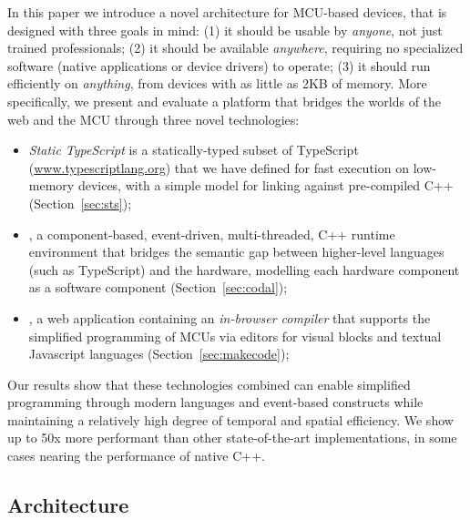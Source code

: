 In this paper we introduce a novel architecture for MCU-based devices,
that is designed with three goals in mind: 
(1) it should be usable by \emph{anyone}, not just trained professionals; 
(2) it should be available \emph{anywhere}, requiring no specialized software (native applications
or device drivers) to operate;
(3) it should run efficiently on \emph{anything}, from devices with as little as 2KB of memory.
More specifically, we present and evaluate a platform that bridges the worlds of the web and the 
MCU through three novel technologies:

\begin{itemize}
\item \emph{Static TypeScript} is a statically-typed subset of TypeScript
(\url{www.typescriptlang.org}) that we have defined for fast execution on low-memory devices,
with a simple model for linking against pre-compiled C++ (Section~\ref{sec:sts});

\item \emph{\CO}, a component-based, event-driven, multi-threaded, C++ runtime environment
that bridges the semantic gap between higher-level languages (such as TypeScript) and the hardware,
modelling each hardware component as a software component (Section~\ref{sec:codal});

\item \emph{\MCN}, a web application containing an \emph{in-browser compiler} that supports the 
simplified programming of MCUs via editors for visual blocks and textual Javascript languages 
(Section~\ref{sec:makecode});
\end{itemize}

Our results show that these technologies combined can enable simplified programming through modern
languages and event-based constructs while maintaining a relatively high degree of temporal and spatial efficiency. 
We show up to 50x more performant than other state-of-the-art implementations, 
in some cases nearing the performance of native C++. 



    


\subsection{Architecture}



